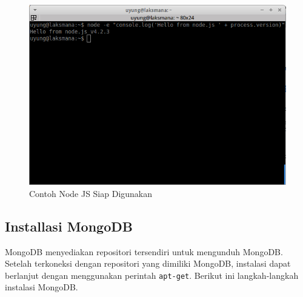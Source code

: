 \documentclass{ta-its}
\begin{document}
				\begin{figure}[h] %
					\centering
					\includegraphics[width=\linewidth]{contoh_img/ceknodejs}
					\caption{Contoh Node JS Siap Digunakan}
					\label{gambarCekNodeJS}
				\end{figure}
			
			\subsection{Installasi MongoDB}
				MongoDB menyediakan repositori tersendiri untuk mengunduh MongoDB. Setelah terkoneksi dengan repositori yang dimiliki MongoDB, instalasi dapat berlanjut dengan menggunakan perintah \texttt{apt-get}. Berikut ini langkah-langkah instalasi MongoDB.
				
\end{document}
